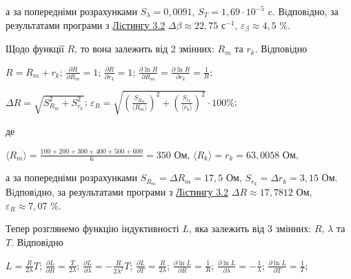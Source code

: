 \documentclass[12pt,a4paper]{article}
\begin{document}
    а за попередніми розрахунками $S_{\lambda} = 0,0091$, $S_T = 1,69 \cdot 10^{-5}$ c. Вiдповiдно, за результатами
    програми з \hyperlink{listing2}{Лiстингу 3.2} $\Delta \beta \approx 22,75 \text{ с}^{-1}$, $\varepsilon_{\beta} \approx 4,5$ \%.

    Щодо функції $R$, то вона залежить від 2 змінних: $R_m$ та $r_k$. Відповідно

    \begin{center}
        $\displaystyle R = R_m + r_k$; $\displaystyle \frac{\partial R}{\partial R_m} = 1$; $\displaystyle \frac{\partial R}{\partial r_k} = 1$;
        $\displaystyle \frac{\partial \ln R}{\partial R_m} = \frac{\partial \ln R}{\partial r_k} = \frac{1}{R}$;
    \end{center}

    \begin{center}
        $\displaystyle \Delta R = \sqrt{S_{R_m}^2 + S_{r_k}^2}$;
        $\displaystyle \varepsilon_R = \sqrt{\left( \frac{S_{R_m}}{\text{⟨}R_m\text{⟩}} \right)^2 + \left( \frac{S_{r_k}}{\text{⟨}r_k\text{⟩}} \right)^2} \cdot 100 \%$;
    \end{center}

    де

    \begin{center}

        $\displaystyle \text{⟨}R_m\text{⟩} = \frac{100+200+300+400+500+600}{6} = 350$ Ом, $\text{⟨}R_k\text{⟩} = r_k = 63,0058$ Ом,

    \end{center}

    а за попередніми розрахунками $S_{R_m} = \Delta R_m = 17,5$ Ом, $S_{r_k} = \Delta r_k = 3,15$ Ом. Вiдповiдно, за результатами
    програми з \hyperlink{listing2}{Лiстингу 3.2} $\Delta R \approx 17,7812$ Ом, $\varepsilon_R \approx 7,07$ \%.

    Тепер розглянемо функцію індуктивності $L$, яка залежить від 3 змінних: $R$, $\lambda$ та $T$. Відповідно

    \begin{center}

        $\displaystyle L = \frac{R}{2\lambda}T$; $\displaystyle \frac{\partial L}{\partial R} = \frac{T}{2\lambda}$; $\displaystyle \frac{\partial L}{\partial \lambda} = -\frac{R}{2\lambda^2}T$; $\displaystyle \frac{\partial L}{\partial T} = \frac{R}{2\lambda}$;
        $\displaystyle \frac{\partial \ln L}{\partial R} = \frac{1}{R}$; $\displaystyle \frac{\partial \ln L}{\partial \lambda} = -\frac{1}{\lambda}$; $\displaystyle \frac{\partial \ln L}{\partial T} = \frac{1}{T}$;

    \end{center}
\end{document}
